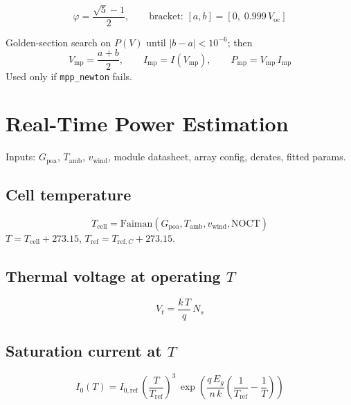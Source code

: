 \documentclass[11pt,a4paper]{article}
\begin{document}
\begin{equation}
  \varphi = \frac{\sqrt{5}-1}{2}, \qquad
  \text{bracket: } [a,b] = [0,\; 0.999\,V_{\mathrm{oc}}]
\end{equation}

Golden-section search on \(P(V)\) until \(|b-a| < 10^{-6}\); then
\begin{equation}
  V_{\mathrm{mp}} = \frac{a+b}{2}, \qquad
  I_{\mathrm{mp}} = I(V_{\mathrm{mp}}), \qquad
  P_{\mathrm{mp}} = V_{\mathrm{mp}}\,I_{\mathrm{mp}}
\end{equation}
Used only if \texttt{mpp\_newton} fails.

\section{Real-Time Power Estimation}

Inputs: \(G_{\mathrm{poa}}\), \(T_{\mathrm{amb}}\), \(v_{\mathrm{wind}}\), module datasheet, array config, derates, fitted params.

\subsection{Cell temperature}
\begin{equation}
  T_{\mathrm{cell}} = \text{Faiman}(G_{\mathrm{poa}}, T_{\mathrm{amb}}, v_{\mathrm{wind}}, \mathrm{NOCT})
\end{equation}
\(T = T_{\mathrm{cell}} + 273.15\), \(T_{\mathrm{ref}} = T_{\mathrm{ref},C} + 273.15\).

\subsection{Thermal voltage at operating \(T\)}
\begin{equation}
  V_t = \frac{k\,T}{q}\,N_s
\end{equation}

\subsection{Saturation current at \(T\)}
\begin{equation}
  \boxed{
  I_0(T) = I_{0,\mathrm{ref}}\,\left(\frac{T}{T_{\mathrm{ref}}}\right)^3\,
  \exp\left(\frac{q\,E_g}{n\,k}\left(\frac{1}{T_{\mathrm{ref}}} - \frac{1}{T}\right)\right)
  }
\end{equation}
\end{document}

